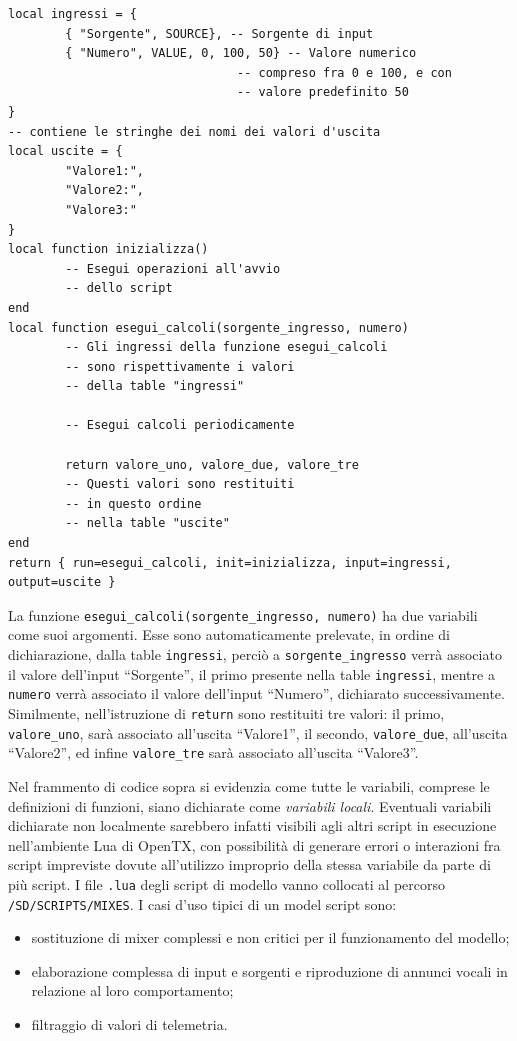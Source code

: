 \documentclass[a4paper, 12pt]{report} %
\begin{document}
\begin{lstlisting}
local ingressi = {
        { "Sorgente", SOURCE}, -- Sorgente di input
        { "Numero", VALUE, 0, 100, 50} -- Valore numerico
                                -- compreso fra 0 e 100, e con 
                                -- valore predefinito 50
}
-- contiene le stringhe dei nomi dei valori d'uscita
local uscite = { 
        "Valore1:",
        "Valore2:",
        "Valore3:"
}
local function inizializza()
        -- Esegui operazioni all'avvio
        -- dello script
end
local function esegui_calcoli(sorgente_ingresso, numero)
        -- Gli ingressi della funzione esegui_calcoli
        -- sono rispettivamente i valori 
        -- della table "ingressi"

        -- Esegui calcoli periodicamente
        
        return valore_uno, valore_due, valore_tre
        -- Questi valori sono restituiti
        -- in questo ordine
        -- nella table "uscite"
end
return { run=esegui_calcoli, init=inizializza, input=ingressi, output=uscite }
\end{lstlisting}

La funzione \texttt{esegui\_calcoli(sorgente\_ingresso, numero)} ha due variabili come suoi argomenti. Esse sono automaticamente prelevate, in ordine di dichiarazione, dalla table \texttt{ingressi}, perciò a \texttt{sorgente\_ingresso} verrà associato il valore dell'input ``Sorgente'', il primo presente nella table \texttt{ingressi}, mentre a \texttt{numero} verrà associato il valore dell'input ``Numero'', dichiarato successivamente. Similmente, nell'istruzione di \texttt{return} sono restituiti tre valori: il primo, \texttt{valore\_uno}, sarà associato all'uscita ``Valore1'', il secondo, \texttt{valore\_due}, all'uscita ``Valore2'', ed infine \texttt{valore\_tre} sarà associato all'uscita ``Valore3''.

Nel frammento di codice sopra si evidenzia come tutte le variabili, comprese le definizioni di funzioni, siano dichiarate come \emph{variabili locali}. Eventuali variabili dichiarate non localmente sarebbero infatti visibili agli altri script in esecuzione nell'ambiente Lua di OpenTX, con possibilità di generare errori o interazioni fra script impreviste dovute all'utilizzo improprio della stessa variabile da parte di più script. I file \texttt{.lua} degli script di modello vanno collocati al percorso \texttt{/SD/SCRIPTS/MIXES}.
I casi d'uso tipici di un model script sono:
\begin{itemize}
        \item sostituzione di mixer complessi e non critici per il funzionamento del modello;
        \item elaborazione complessa di input e sorgenti e riproduzione di annunci vocali in relazione al loro comportamento;
        \item filtraggio di valori di telemetria.
\end{itemize}
\end{document}
